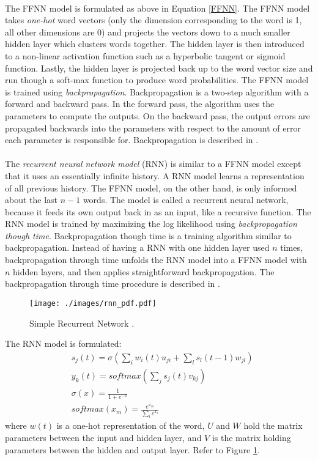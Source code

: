 \paragraph{}
The FFNN model is formulated as above in Equation \ref{FFNN}. The FFNN model takes \emph{one-hot} word vectors (only the dimension corresponding to the word is 1, all other dimensions are 0) and projects the vectors down to a much smaller hidden layer which clusters words together. The hidden layer is then introduced to a non-linear activation function such as a hyperbolic tangent or sigmoid function. Lastly, the hidden layer is projected back up to the word vector size and run though a soft-max function to produce word probabilities. The FFNN model is trained using \emph{backpropagation}. Backpropagation is a two-step algorithm with a forward and backward pass. In the forward pass, the algorithm uses the parameters to compute the outputs. On the backward pass, the output errors are propagated backwards into the parameters with respect to the amount of error each parameter is responsible for. Backpropagation is described in \cite{Bengio2003}.

\paragraph{}
The \emph{recurrent neural network model} (RNN) is similar to a FFNN model except that it uses an essentially infinite history. A RNN model learns a representation of all previous history. The FFNN model, on the other hand, is only informed about the last $n-1$ words. The model is called a recurrent neural network, because it feeds its own output back in as an input, like a recursive function. The RNN model is trained by maximizing the log likelihood using \emph{backpropagation though time}. Backpropagation though time is a training algorithm similar to backpropagation. Instead of having a RNN with one hidden layer used $n$ times, backpropagation through time unfolds the RNN model into a FFNN model with $n$ hidden layers, and then applies straightforward backpropagation. The backpropagation through time procedure is described in \cite{Mikolov2012}.

\begin{figure}
\centering
\texttt{[image: ./images/rnn\_pdf.pdf]}
\caption{Simple Recurrent Network \cite[pg. 34]{Mikolov2012}.}
\label{fig:RNNfigure}
\end{figure}

The RNN model is formulated:
\begin{align}
&s_j(t) = \sigma \left( \sum_i w_i(t) u_{ji} + \sum_l s_l (t-1) w_{jl} \right)
\\
&y_k(t) = softmax \left( \sum_j s_j(t) v_{kj} \right)
\\ 
&\sigma(x) = \frac{1}{1+e^{-x}} \nonumber
\\ 
&softmax(x_m) = \frac{e^{x_m} }{ \sum_i e^{x_i} }  \nonumber
\end{align}
where $w(t)$ is a one-hot representation of the word, $U$ and $W$ hold the matrix parameters between the input and hidden layer, and $V$ is the matrix holding parameters between the hidden and output layer. Refer to Figure \ref{fig:RNNfigure}.

